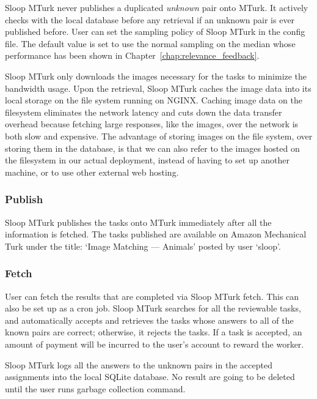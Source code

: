 Sloop MTurk never publishes a duplicated \emph{unknown} pair onto MTurk. It
actively checks with the local database before any retrieval if an unknown pair
is ever published before. User can set the sampling policy of Sloop MTurk in
the config file. The default value is set to use the normal sampling on the
median whose performance has been shown in
Chapter~\ref{chap:relevance_feedback}.

Sloop MTurk only downloads the images necessary for the tasks to minimize the
bandwidth usage. Upon the retrieval, Sloop MTurk caches the image data into its
local storage on the file system running on NGINX\@. Caching image data on the
filesystem eliminates the network latency and cuts down the data transfer
overhead because fetching large responses, like the images, over the network is
both slow and expensive. The advantage of storing images on the file system,
over storing them in the database, is that we can also refer to the images
hosted on the filesystem in our actual deployment, instead of having to set up
another machine, or to use other external web hosting.

\subsubsection{Publish}

Sloop MTurk publishes the tasks onto MTurk immediately after all the
information is fetched. The tasks published are available on Amazon Mechanical
Turk under the title: `Image Matching --- Animals' posted by user `sloop'.

\subsubsection{Fetch}

User can fetch the results that are completed via Sloop MTurk fetch. This can
also be set up as a cron job. Sloop MTurk searches for all the reviewable
tasks, and automatically accepts and retrieves the tasks whose answers to all
of the known pairs are correct; otherwise, it rejects the tasks. If a task is
accepted, an amount of payment will be incurred to the user's account to reward
the worker.

Sloop MTurk logs all the answers to the unknown pairs in the accepted
assignments into the local SQLite database. No result are going to be deleted
until the user runs garbage collection command.

